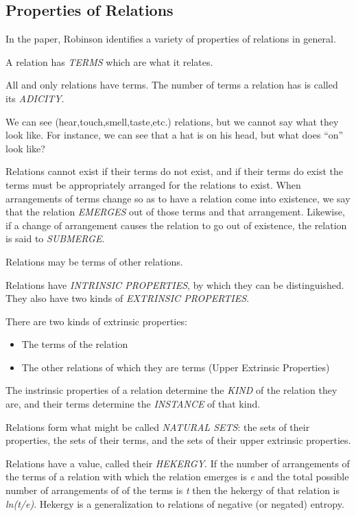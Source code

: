 \documentclass[11pt]{article}
\begin{document}
\subsection{Properties of Relations}
\label{sec-1.4}

In the paper, Robinson identifies a variety of properties of relations in 
general.

A relation has \emph{TERMS} which are what it relates.

All and only relations have terms. The number of terms a relation 
has is called its \emph{ADICITY}.

We can see (hear,touch,smell,taste,etc.) relations, but we cannot 
say what they look like. For instance, we can see that a hat is
on his head, but what does ``on'' look like?

Relations cannot exist if their terms do not exist, and if their
terms do exist the terms must be appropriately arranged for the
relations to exist. When arrangements of terms change so as to
have a relation come into existence, we say that the relation
\emph{EMERGES} out of those terms and that arrangement. Likewise,
if a change of arrangement causes the relation to go out of 
existence, the relation is said to \emph{SUBMERGE}.

Relations may be terms of other relations.

Relations have \emph{INTRINSIC PROPERTIES}, by which they can be
distinguished. They also have two kinds of \emph{EXTRINSIC PROPERTIES}.

There are two kinds of extrinsic properties:
\begin{itemize}
\item The terms of the relation
\item The other relations of which they are terms (Upper Extrinsic Properties)
\end{itemize}
The instrinsic properties of a relation determine the \emph{KIND}
of the relation they are, and their terms determine the
\emph{INSTANCE} of that kind.

Relations form what might be called \emph{NATURAL SETS}: the sets of
their properties, the sets of their terms, and the sets of their
upper extrinsic properties.

Relations have a value, called their \emph{HEKERGY}. If the number
of arrangements of the terms of a relation with which the 
relation emerges is \emph{e} and the total possible number of
arrangements of of the terms is \emph{t} then the hekergy of that
relation is \emph{ln(t/e)}. Hekergy is a generalization to relations
of negative (or negated) entropy.
\end{document}
